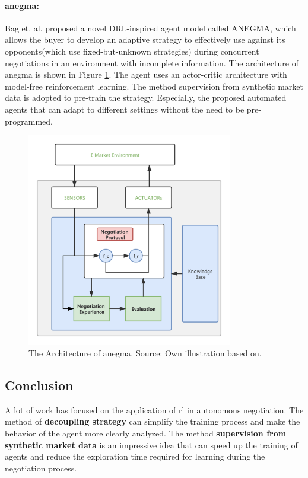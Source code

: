 \paragraph{\gls{anegma}\parencite{bagga2020deep}:} Bag et. al. proposed a novel DRL-inspired agent model called ANEGMA, which allows the buyer to develop an adaptive strategy to effectively use against its opponents(which use fixed-but-unknown strategies) during concurrent negotiations in an environment with incomplete information. The architecture of \gls{anegma} is shown in Figure \ref{fig:anegma}. The agent uses an actor-critic architecture with model-free reinforcement learning. The method supervision from synthetic market data is adopted to pre-train the strategy. Especially, the proposed automated agents that can adapt to different settings without the need to be pre-programmed.

\begin{figure}[htbp]
\centering
\includegraphics[width=0.8\textwidth]{./images/anegma.png}
\caption{The Architecture of \gls{anegma}. Source: Own illustration based on\parencite{bagga2020deep}.}
\label{fig:anegma}
\end{figure}

\subsection{Conclusion}
A lot of work has focused on the application of \gls{rl} in autonomous negotiation. The method of \textbf{decoupling strategy} can simplify the training process and make the behavior of the agent more clearly analyzed. The method \textbf{supervision from synthetic market data} is an impressive idea that can speed up the training of agents and reduce the exploration time required for learning during the negotiation process.

